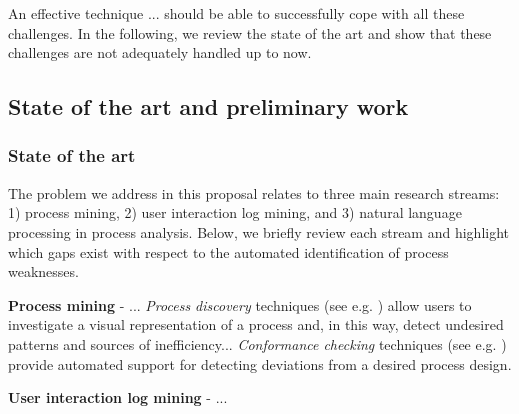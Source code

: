 \documentclass{scrartcl}
\begin{document}
An effective technique ... should be able to successfully cope with all these challenges. In the following, we review the state of the art and show that these challenges are not adequately handled up to now.

\subsection{State of the art and preliminary work}

\subsubsection{State of the art}

The problem we address in this proposal relates to three main research streams: 1) process mining, 2) user interaction log mining, and 3) natural language processing in process analysis. Below, we briefly review each stream and highlight which gaps exist with respect to the automated identification of process weaknesses.  

\textbf{Process mining} - ...  \textit{Process discovery} techniques (see e.g. \cite{gunther2007fuzzy,weijters2011flexible,leemans2013discovering}) allow users to investigate a visual representation of a process and, in this way, detect undesired patterns and sources of inefficiency... \textit{Conformance checking} techniques (see e.g. \cite{rozinat2008conformance,adriansyah2011conformance}) provide automated support for detecting deviations from a desired process design. 


\textbf{User interaction log mining} - ...

\end{document}
